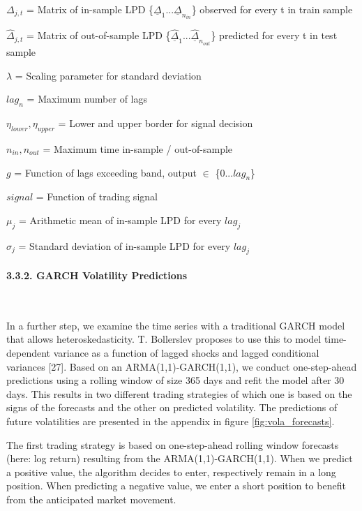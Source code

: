 \documentclass[
]{article}
\begin{document}
~

\(\Delta_{j,t}\) = Matrix of in-sample LPD
\{\(\underline{\Delta}_{1}...\underline{\Delta}_{n_{in}}\)\} observed
for every t in train sample

\(\hat{\Delta}_{j,t}\) = Matrix of out-of-sample LPD
\{\(\underline{\hat{\Delta}}_{1}...\underline{\hat{\Delta}}_{n_{out}}\)\}
predicted for every t in test sample

\(\lambda\) = Scaling parameter for standard deviation

\(lag_{n}\) = Maximum number of lags

\(\eta_{lower},\eta_{upper}\) = Lower and upper border for signal
decision

\(n_{in}, n_{out}\) = Maximum time in-sample / out-of-sample

\(g\) = Function of lags exceeding band, output \(\in\)
\{\(0...lag_{n}\)\}

\(signal\) = Function of trading signal

\(\mu_{j}\) = Arithmetic mean of in-sample LPD for every \(lag_{j}\)

\(\sigma_{j}\) = Standard deviation of in-sample LPD for every
\(lag_{j}\)

\newpage

\hypertarget{garch-signal}{%
\paragraph{3.3.2. GARCH Volatility Predictions}\label{garch-signal}}

~

In a further step, we examine the time series with a traditional GARCH
model that allows heteroskedasticity. T. Bollerslev proposes to use this
to model time-dependent variance as a function of lagged shocks and
lagged conditional variances {[}27{]}. Based on an ARMA(1,1)-GARCH(1,1),
we conduct one-step-ahead predictions using a rolling window of size 365
days and refit the model after 30 days. This results in two different
trading strategies of which one is based on the signs of the forecasts
and the other on predicted volatility. The predictions of future
volatilities are presented in the appendix in figure
\ref{fig:vola_forecasts}.

The first trading strategy is based on one-step-ahead rolling window
forecasts (here: log return) resulting from the ARMA(1,1)-GARCH(1,1).
When we predict a positive value, the algorithm decides to enter,
respectively remain in a long position. When predicting a negative
value, we enter a short position to benefit from the anticipated market
movement.
\end{document}
